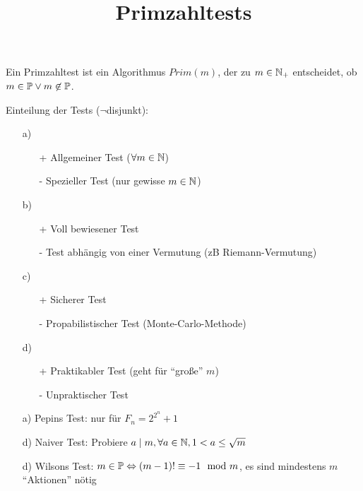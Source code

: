 \documentclass[a4paper,DIV15,BCOR12mm]{article}
\title{Primzahltests }
\begin{document}
\maketitle


Ein Primzahltest ist ein Algorithmus $Prim(m)$, der zu $m \in \mathbb{N}_+$ entscheidet, ob $m \in \mathbb{P} \vee m \not\in \mathbb{P}$.

Einteilung der Tests ($\neg$disjunkt):
\begin{itemize}
 \item[a)] 
  \begin{itemize}
   \item[+] Allgemeiner Test ($\forall m \in \mathbb{N}$)
   \item[-] Spezieller Test (nur gewisse $m \in \mathbb{N}$)
  \end{itemize}
 \item[b)] 
  \begin{itemize}
   \item[+] Voll bewiesener Test
   \item[-] Test abhängig von einer Vermutung (zB Riemann-Vermutung)
  \end{itemize}
 \item[c)] 
  \begin{itemize}
   \item[+] Sicherer Test
   \item[-] Propabilistischer Test (Monte-Carlo-Methode)
  \end{itemize}
 \item[d)] 
  \begin{itemize}
   \item[+] Praktikabler Test (geht für "`große"' $m$)
   \item[-] Unpraktischer Test
  \end{itemize}
\end{itemize}

\begin{beispiel}
 \begin{itemize}
  \item[a)] Pepins Test: nur für $F_n = 2^{2^n} + 1$
  \item[d)] Naiver Test: Probiere $a \mid m, \forall a \in \mathbb{N}, 1 < a \le \sqrt{m}$
  \item[d)] Wilsons Test: $m \in \mathbb{P} \Leftrightarrow (m-1)! \equiv -1 \mod m$, es sind mindestens $m$ "`Aktionen"' nötig
 \end{itemize}
\end{beispiel}
\end{document}
